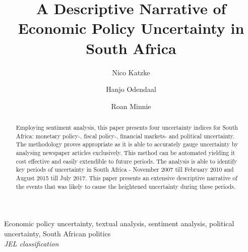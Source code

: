 \documentclass[11pt,preprint, authoryear]{elsarticle}
\numberwithin{equation}{section}
\numberwithin{figure}{section}
\numberwithin{table}{section}
\begin{document}
\begin{frontmatter}  %

\title{A Descriptive Narrative of Economic Policy Uncertainty in South Africa}



\author[Add1]{Nico Katzke}

\author[Add2]{Hanjo Odendaal}

\author[Add3]{Roan Minnie}

\address[Add1]{Stellenbosch University, Stellenbosch, South Africa; Prescient Securities, Cape Town, South Africa}
\address[Add2]{Stellenbosch University, Stellenbosch, South Africa; Bureau of Economic
Research, South Africa}
\address[Add3]{Stellenbosch University, Stellenbosch, South Africa}


\begin{abstract}
	\small{
		Employing sentiment analysis, this paper presents four uncertainty indices for South Africa: monetary policy-, fiscal policy-, financial markets- and political uncertainty. The methodology proves appropriate as it is able to accurately gauge uncertainty by analysing newspaper articles exclusively. This method can be automated yielding it cost effective and easily extendible to future periods. The analysis is able to identify key periods of uncertainty in South Africa - November 2007 till February 2010 and August 2015 till July 2017. This paper presents an extensive descriptive narrative of the events that was likely to cause the heightened uncertainty during these periods. 
	}
\end{abstract}
\vspace{1cm}

\begin{keyword}
\footnotesize{Economic policy uncertainty, textual analysis, sentiment analysis, political uncertainty, South African politics
 \\ \vspace{0.3cm}
\textit{JEL classification} 
}
\end{keyword}
\vspace{0.5cm}
\end{frontmatter}



\pagestyle{fancy}
\chead{}
\rhead{}
\lfoot{}
\lhead{}
\cfoot{}
\end{document}
